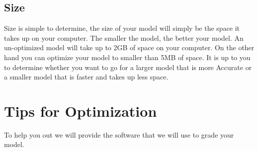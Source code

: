 \documentclass[11pt]{report}
\begin{document}
\section{Size}
Size is simple to determine, the size of your model will simply be the space it takes up on your computer. The smaller the model, the better your model. An un-optimized model will take up to 2GB of space on your computer. On the other hand you can optimize your model to smaller than 5MB of space. It is up to you to determine whether you want to go for a larger model that is more Accurate or a smaller model that is faster and takes up less space.

\chapter{Tips for Optimization}
To help you out we will provide the software that we will use to grade your model.
\end{document}
